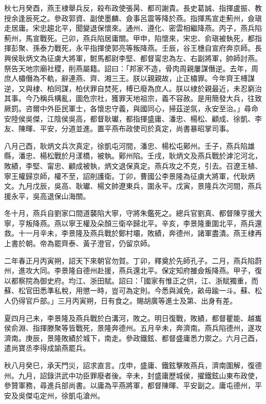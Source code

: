 \begin{pinyinscope}
秋七月癸酉，燕王棣舉兵反，殺布政使張昺、都司謝貴。長史葛誠、指揮盧振、教授余逢辰死之。參政郭資、副使墨麟、僉事呂震等降於燕。指揮馬宣走薊州，僉瑱走居庸。宋忠趨北平，聞變退保懷來。通州、遵化、密雲相繼降燕。丙子，燕兵陷薊州，馬宣戰死。己卯，燕兵陷居庸關。甲申，陷懷來，宋忠、俞瑱被執死，都指揮彭聚、孫泰力戰死，永平指揮使郭亮等叛降燕。壬辰，谷王橞自宣府奔京師。長興侯耿炳文為征虜大將軍，駙馬都尉李堅、都督甯忠為左、右副將軍，帥師討燕。祭告天地宗廟社稷，削燕屬籍。詔曰：「邦家不造，骨肉周親屢謀僭逆。去年，周庶人橚僭為不軌，辭連燕、齊、湘三王。朕以親親故，止正橚罪。今年齊王榑謀逆，又與棣、柏同謀，柏伏罪自焚死，榑已廢為庶人。朕以棣於親最近，未忍窮治其事。今乃稱兵構亂，圖危宗社，獲罪天地祖宗，義不容赦。是用簡發大兵，往致厥罰。咨爾中外臣民軍士，各懷忠守義，與國同心，掃茲逆氛，永安至治。」尋命安陸侯吳傑，江陰侯吳高，都督耿瓛，都指揮盛庸、潘忠、楊松、顧成、徐凱、李友、陳暉、平安，分道並進。置平燕布政使司於真定，尚書暴昭掌司事。

八月己酉，耿炳文兵次真定，徐凱屯河間，潘忠、楊松屯鄚州。壬子，燕兵陷雄縣，潘忠、楊松戰於月漾橋，被執。鄚州陷。壬戌，耿炳文及燕兵戰於滹沱河北，敗績，李堅、甯忠、顧成被執，炳文退保真定。燕兵攻之不克，引去。召遼王植、寧王權歸京師，權不至，詔削護衛。丁卯，曹國公李景隆為征虜大將軍，代耿炳文。九月戊辰，吳高、耿瓛、楊文帥遼東兵，圍永平。戊寅，景隆兵次河間，燕兵援永平，吳高退保山海關。

冬十月，燕兵自劉家口間道襲陷大寧，守將朱鑑死之。總兵官劉真、都督陳亨援大寧，亨叛降燕。燕以寧王權及朵顏三衛卒歸北平。辛亥，李景隆重圍北平，燕兵還救。十一月辛未，李景隆及燕兵戰於鄭村壩，敗績，奔德州，諸軍盡潰。燕王棣再上書於朝。帝為罷齊泰、黃子澄官，仍留京師。

二年春正月丙寅朔，詔天下來朝官勿賀。丁卯，釋奠於先師孔子。二月，燕兵陷蔚州，進攻大同。李景隆自德州赴援，燕兵還北平。保定知府雒僉叛降燕。甲子，復以都察院為御史府。均江、浙田賦。詔曰：「國家有惟正之供，江、浙賦獨重，而蘇、松官田悉準私稅，用懲一時，豈可為定則。今悉與減免，畝毋踰一斗。蘇、松人仍得官戶部。」三月丙寅朔，日有食之。賜胡廣等進士及第、出身有差。

夏四月己未，李景隆及燕兵戰於白溝河，敗之。明日復戰，敗績，都督瞿能、越巂侯俞淵、指揮滕聚等皆戰死，景隆奔德州。五月辛未，奔濟南。燕兵陷德州，遂攻濟南。庚辰，景隆敗績於城下，南走。參政鐵鉉、都督盛庸悉力禦之。六月己酉，遣尚寶丞李得成諭燕罷兵。

秋八月癸巳，承天門災，詔求直言。戊申，盛庸、鐵鉉擊敗燕兵，濟南圍解，復德州。九月，詔錄洪武中功臣罪廢者後。辛未，封盛庸歷城侯，擢鐵鉉山東布政使，參贊軍務，尋進兵部尚書。以庸為平燕將軍，都督陳暉、平安副之。庸屯德州，平安及吳傑屯定州，徐凱屯滄州。


\end{pinyinscope}
